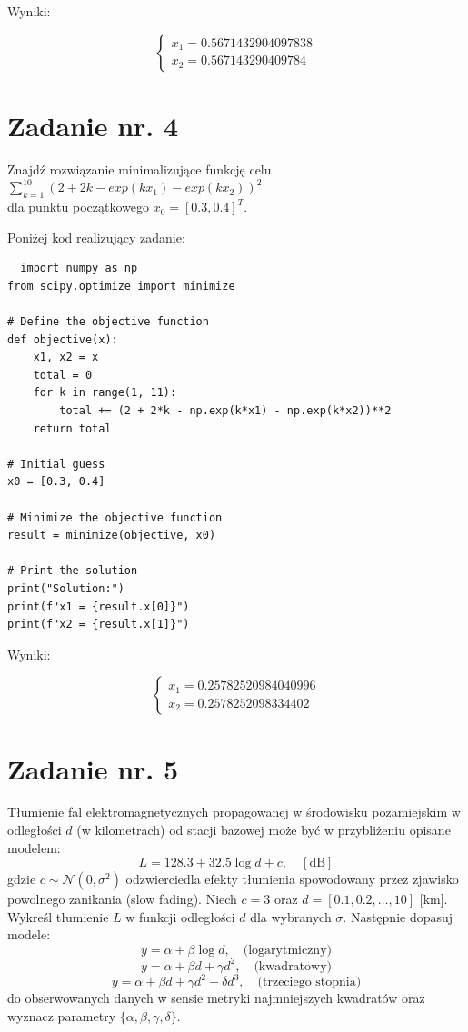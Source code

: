 \documentclass{article}
\begin{document}
Wyniki:

\begin{equation}
  \begin{cases}
    x_1=0.5671432904097838\\
    x_2=0.567143290409784
  \end{cases}
\end{equation}

\section{Zadanie nr. 4}
Znajdź rozwiązanie minimalizujące funkcję celu\\
$\sum_{k=1}^{10}(2+2k-exp(kx_1)-exp(kx_2))^2$\\
dla punktu początkowego $x_0=[0.3, 0.4]^T$.

Poniżej kod realizujący zadanie:

\begin{lstlisting}
  import numpy as np
from scipy.optimize import minimize

# Define the objective function
def objective(x):
    x1, x2 = x
    total = 0
    for k in range(1, 11):
        total += (2 + 2*k - np.exp(k*x1) - np.exp(k*x2))**2
    return total

# Initial guess
x0 = [0.3, 0.4]

# Minimize the objective function
result = minimize(objective, x0)

# Print the solution
print("Solution:")
print(f"x1 = {result.x[0]}")
print(f"x2 = {result.x[1]}")
\end{lstlisting}

Wyniki:

\begin{equation}
  \begin{cases}
    x_1=0.25782520984040996\\
    x_2=0.2578252098334402
  \end{cases}
\end{equation}

\section{Zadanie nr. 5}
Tłumienie fal elektromagnetycznych propagowanej w środowisku pozamiejskim w odległości \( d \) (w kilometrach) od stacji bazowej może być w przybliżeniu opisane modelem:
\[
L = 128.3 + 32.5 \log d + c, \quad [\text{dB}]
\]
gdzie \( c \sim \mathcal{N}(0, \sigma^2) \) odzwierciedla efekty tłumienia spowodowany przez zjawisko powolnego zanikania (slow fading). Niech \( c = 3 \) oraz \( d = [0.1, 0.2, \ldots, 10] \) [km]. Wykreśl tłumienie \( L \) w funkcji odległości \( d \) dla wybranych \( \sigma \). Następnie dopasuj modele:
\[
y = \alpha + \beta \log d, \quad \text{(logarytmiczny)}
\]
\[
y = \alpha + \beta d + \gamma d^2, \quad \text{(kwadratowy)}
\]
\[
y = \alpha + \beta d + \gamma d^2 + \delta d^3, \quad \text{(trzeciego stopnia)}
\]
do obserwowanych danych w sensie metryki najmniejszych kwadratów oraz wyznacz parametry \( \{ \alpha, \beta, \gamma, \delta \} \).
\newline
\end{document}
